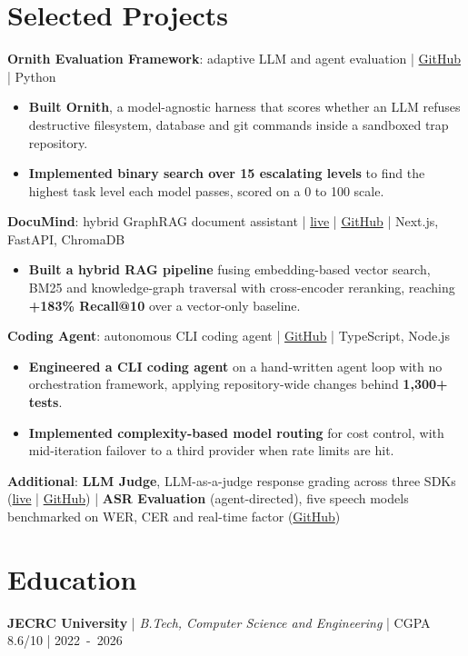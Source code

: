 \documentclass[10pt,letterpaper]{article}
\newcommand{\entrygap}{\vspace{3pt}}
\begin{document}
\section*{Selected Projects}

\textbf{Ornith Evaluation Framework}: adaptive LLM and agent evaluation | \href{https://github.com/dakshjain-1616/Ornith-Evaluation-Framework}{GitHub} | Python
\begin{itemize}
  \item \textbf{Built Ornith}, a model-agnostic harness that scores whether an LLM refuses destructive filesystem, database and git commands inside a sandboxed trap repository.
  \item \textbf{Implemented binary search over 15 escalating levels} to find the highest task level each model passes, scored on a 0 to 100 scale.
\end{itemize}

\entrygap
\textbf{DocuMind}: hybrid GraphRAG document assistant | \href{https://docu-mind-ai-nu.vercel.app}{live} | \href{https://github.com/Dakshjain1604/DocuMind-Ai}{GitHub} | Next.js, FastAPI, ChromaDB
\begin{itemize}
  \item \textbf{Built a hybrid RAG pipeline} fusing embedding-based vector search, BM25 and knowledge-graph traversal with cross-encoder reranking, reaching \textbf{+183\% Recall@10} over a vector-only baseline.
\end{itemize}

\entrygap
\textbf{Coding Agent}: autonomous CLI coding agent | \href{https://github.com/Dakshjain1604/Ai-coding-Agent}{GitHub} | TypeScript, Node.js
\begin{itemize}
  \item \textbf{Engineered a CLI coding agent} on a hand-written agent loop with no orchestration framework, applying repository-wide changes behind \textbf{1,300+ tests}.
  \item \textbf{Implemented complexity-based model routing} for cost control, with mid-iteration failover to a third provider when rate limits are hit.
\end{itemize}

\entrygap
\textbf{Additional}: \textbf{LLM Judge}, LLM-as-a-judge response grading across three SDKs
(\href{https://llm-judge-frontend-2w8gertod-dakshjain1604s-projects.vercel.app}{live} |
\href{https://github.com/Dakshjain1604/LLM-response-Judge}{GitHub}) | \textbf{ASR Evaluation}
(agent-directed), five speech models benchmarked on WER, CER and real-time factor
(\href{https://github.com/dakshjain-1616/Asr-Evaluation}{GitHub})

\section*{Education}

\textbf{JECRC University} | \textit{B.Tech, Computer Science and Engineering} | CGPA 8.6/10 |
\mbox{2022 - 2026}
\end{document}

